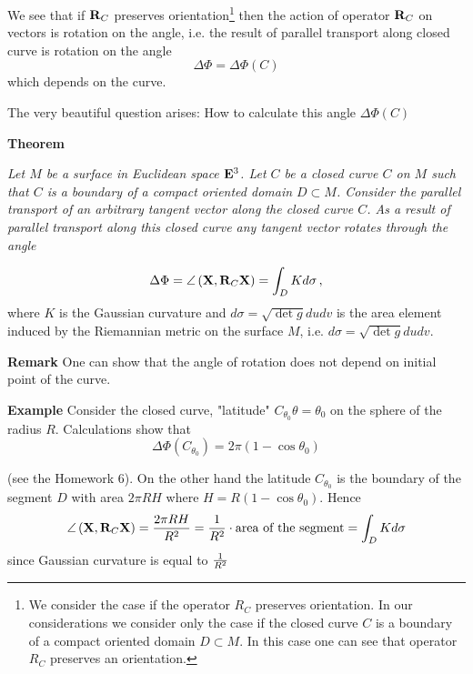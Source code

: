\documentclass[12pt]{article}
\theoremstyle{theorem}
\numberwithin{equation}{section}
\begin{document}
We see that if ${\bf R}_C$ preserves orientation\footnote{We consider the case if the operator $R_C$ preserves orientation.
In our considerations we consider only the case if the closed curve $C$ is a boundary of
a compact oriented domain $D\subset M$. In this case one can see that operator $R_C$ preserves an orientation.}
 then the action of operator ${\bf R}_C$ on vectors is rotation on the angle,
i.e. the result of parallel transport along closed curve is rotation on the angle
                               \begin{equation}\label{rotationontheangle}
                               \Delta\Phi=\Delta\Phi(C)
                               \end{equation}
 which depends on the curve.


The very beautiful question arises:  How to calculate this angle $\Delta\Phi(C)$


\m

{\bf Theorem}
{\it  Let $M$ be a surface in  Euclidean space ${\bf E}^3$.
  Let $C$ be a closed curve $C$ on $M$ such that $C$ is a boundary of a compact oriented domain $D\subset M$.
Consider the parallel transport of an arbitrary tangent vector along the closed curve $C$.
As a result of parallel transport along this closed curve any  tangent vector rotates through the angle

\begin{equation}\label{theoremofrotationonangle}
\Delta\Phi=\angle\left({{\bf X}, {\bf R}_C{\bf X}}\right)=\int_D K d\sigma\,,
             \end{equation}
where $K$ is the Gaussian curvature and $d\sigma=\sqrt {\det g}dudv$ is the area element induced by the
Riemannian metric on the surface $M$, i.e.  $d\sigma=\sqrt {\det g}dudv$.



}

\m
{\bf Remark} One can show that the angle of rotation does not depend on initial point of the curve.


\m


{\bf Example} Consider the closed curve, "latitude" $C_{\theta_0}\theta=\theta_0$ on the sphere of the radius $R$.
Calculations show that
               \begin{equation}\label{rotationforlatitude}
                \Delta\Phi(C_{\theta_0})=2\pi(1-\cos\theta_0)
               \end{equation}

(see the Homework 6). On the other hand the latitude $C_{\theta_0}$ is the boundary of the segment  $D$
 with area $2\pi RH$ where $H=R(1-\cos \theta_0)$. Hence
           $$
   \angle\left({{\bf X}, {\bf R}_C{\bf X}}\right)={2\pi RH\over R^2}={1\over R^2}\cdot \hbox{area of the segment}=\int_D  Kd\sigma
           $$
since Gaussian curvature is equal to $1\over R^2$
\end{document}
